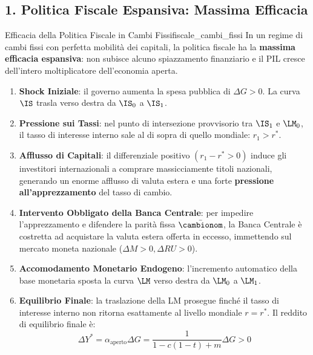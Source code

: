 \subsection{1. Politica Fiscale Espansiva: Massima Efficacia}

\begin{teorema}{Efficacia della Politica Fiscale in Cambi Fissi}{fiscale_cambi_fissi}
In un regime di cambi fissi con perfetta mobilità dei capitali, la politica fiscale ha la \textbf{massima efficacia espansiva}: non subisce alcuno spiazzamento finanziario e il PIL cresce dell'intero moltiplicatore dell'economia aperta.
\end{teorema}

\begin{dimostrazione}
\begin{enumerate}
    \item \textbf{Shock Iniziale}: il governo aumenta la spesa pubblica di $\Delta G > 0$. La curva $\IS$ trasla verso destra da $\IS_0$ a $\IS_1$.
    \item \textbf{Pressione sui Tassi}: nel punto di intersezione provvisorio tra $\IS_1$ e $\LM_0$, il tasso di interesse interno sale al di sopra di quello mondiale: $r_1 > r^*$.
    \item \textbf{Afflusso di Capitali}: il differenziale positivo $(r_1 - r^* > 0)$ induce gli investitori internazionali a comprare massicciamente titoli nazionali, generando un enorme afflusso di valuta estera e una forte \textbf{pressione all'apprezzamento} del tasso di cambio.
    \item \textbf{Intervento Obbligato della Banca Centrale}: per impedire l'apprezzamento e difendere la parità fissa $\bar{\cambionom}$, la Banca Centrale è costretta ad acquistare la valuta estera offerta in eccesso, immettendo sul mercato moneta nazionale ($\Delta M > 0, \Delta RU > 0$).
    \item \textbf{Accomodamento Monetario Endogeno}: l'incremento automatico della base monetaria sposta la curva $\LM$ verso destra da $\LM_0$ a $\LM_1$.
    \item \textbf{Equilibrio Finale}: la traslazione della LM prosegue finché il tasso di interesse interno non ritorna esattamente al livello mondiale $r = r^*$.
    Il reddito di equilibrio finale è:
    \begin{equation}
        \Delta Y^* = \alpha_{\text{aperto}} \Delta G = \frac{1}{1 - c(1-t) + m} \Delta G > 0
    \end{equation}
\end{enumerate}
\end{dimostrazione}

